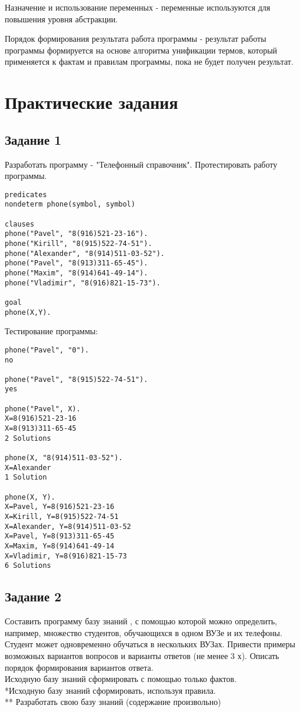 Назначение и использование переменных - переменные используются для повышения уровня абстракции.

Порядок формирования результата работа программы - результат работы программы формируется на основе алгоритма унификации термов, который применяется к фактам и правилам программы, пока не будет получен результат.

\chapter{Практические задания}
\section{Задание 1}
Разработать программу - "Телефонный справочник". Протестировать работу программы.
\begin{lstlisting}
predicates
nondeterm phone(symbol, symbol)

clauses
phone("Pavel", "8(916)521-23-16").
phone("Kirill", "8(915)522-74-51").
phone("Alexander", "8(914)511-03-52").
phone("Pavel", "8(913)311-65-45").
phone("Maxim", "8(914)641-49-14").
phone("Vladimir", "8(916)821-15-73").

goal
phone(X,Y).
\end{lstlisting}

Тестирование программы:\\
\begin{lstlisting}
phone("Pavel", "0").
no

phone("Pavel", "8(915)522-74-51"). 
yes

phone("Pavel", X).
X=8(916)521-23-16
X=8(913)311-65-45
2 Solutions	

phone(X, "8(914)511-03-52").
X=Alexander
1 Solution  

phone(X, Y).
X=Pavel, Y=8(916)521-23-16
X=Kirill, Y=8(915)522-74-51
X=Alexander, Y=8(914)511-03-52
X=Pavel, Y=8(913)311-65-45
X=Maxim, Y=8(914)641-49-14
X=Vladimir, Y=8(916)821-15-73
6 Solutions
\end{lstlisting}

\section{Задание 2}
Составить программу базу знаний , с помощью которой можно определить, например, множество студентов, обучающихся в одном ВУЗе и их телефоны. Студент может одновременно обучаться в нескольких ВУЗах. Привести примеры возможных вариантов вопросов и варианты ответов (не менее 3 х). Описать порядок формирования вариантов ответа.\\
Исходную базу знаний сформировать с помощью только фактов.\\
*Исходную базу знаний сформировать, используя правила.\\
** Разработать свою базу знаний (содержание произвольно)\\

